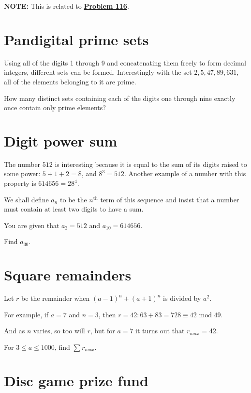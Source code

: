 \textbf{NOTE:} This is related to \hyperref[pb.0116]{\textbf{Problem 116}}.



\section{Pandigital prime sets} \label{pb.0118}

Using all of the digits 1 through 9 and concatenating them freely to form decimal integers, different sets can be formed. Interestingly with the set ${2,5,47,89,631}$, all of the elements belonging to it are prime.
\medskip

How many distinct sets containing each of the digits one through nine exactly once contain only prime elements?


\section{Digit power sum} \label{pb.0119}

The number $512$ is interesting because it is equal to the sum of its digits raised to some power: $5 + 1 + 2 = 8$, and $8^3 = 512$. Another example of a number with this property is $614656 = 28^4$.

We shall define $a_n$ to be the $n^{\text{th}}$ term of this sequence and insist that a number must contain at least two digits to have a sum.

You are given that $a_2 = 512$ and $a_{10} = 614656$.
\medskip

Find $a_{30}$.


\section{Square remainders} \label{pb.0120}

Let $r$ be the remainder when $(a-1)^n + (a+1)^n$ is divided by $a^2$.
\medskip

For example, if $a = 7$ and $n = 3$, then $r = 42: 63 + 83 = 728 \equiv 42 \text{ mod } 49$.

And as $n$ varies, so too will $r$, but for $a = 7$ it turns out that $r_{max}$ = 42.
\medskip

For $3 \leqslant a \leqslant 1000$, find $\sum r_{max}$.


\section{Disc game prize fund} \label{pb.0121}

